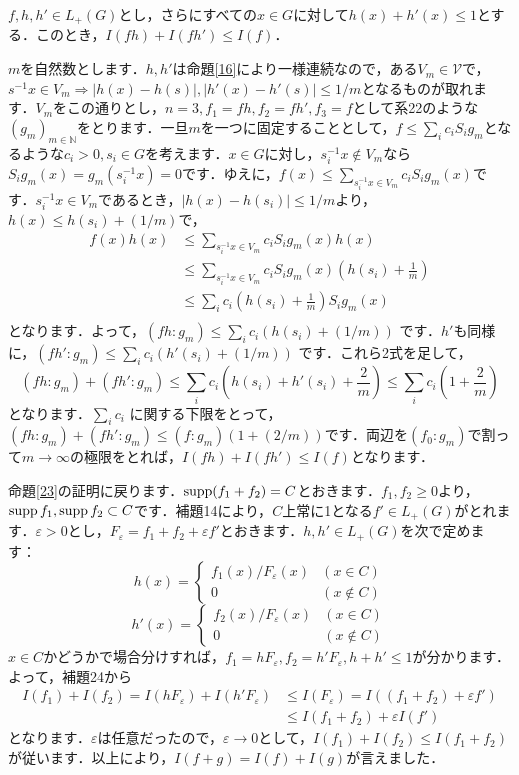 \begin{Proof}
\begin{ylem}\label{24}
$f, h, h'\in L_{+}(G)$とし，さらにすべての$x \in G$に対して$h(x)+h'(x) \le 1$とする．このとき，$I(fh)+I(fh') \le I(f)$．
\end{ylem}
\begin{Proof}
$m$を自然数とします．$h,h'$は命題\ref{16}により一様連続なので，ある$V_m \in \mathscr{V}$で，$s^{-1}x \in V_{m} \Rightarrow |h(x)-h(s)|, |h'(x)-h'(s)| \le 1/m$となるものが取れます．$V_m$をこの通りとし，$n=3, f_1=fh, f_2=fh', f_3=f$として系22のような$(g_m)_{m \in \mathbb{N}}$をとります．一旦$m$を一つに固定することとして，$f \le \sum_{i}c_i S_{i}g_m$となるような$c_i>0, s_i \in G$を考えます．$x \in G$に対し，$s_{i}^{-1}x \not\in V_m$なら$S_{i}g_{m}(x)=g_{m}(s_{i}^{-1}x)=0$です．ゆえに，$f(x) \le \sum_{s_{i}^{-1}x \in V_m} c_{i}S_{i}g_{m}(x)$です．$s_{i}^{-1}x \in V_m$であるとき，$|h(x)-h(s_i)| \le 1/m$より，$h(x) \le h(s_i)+(1/m)$で，
\begin{align*}
f(x)h(x)  & \le \sum_{s_{i}^{-1}x \in V_m} c_{i}S_{i}g_{m}(x)h(x) \\
& \le \sum_{s_{i}^{-1}x \in V_m} c_{i}S_{i}g_{m}(x) \left( h(s_i)+\frac{1}{m} \right) \\
& \le \sum_{i}c_{i} \left( h(s_i)+\frac{1}{m} \right) S_{i}g_{m}(x) \\
\end{align*}
となります．よって，$( fh : g_m ) \le \sum_{i}c_{i} ( h(s_i)+(1/m) )$ です．$h'$も同様に，$( fh' : g_m ) \le \sum_{i}c_{i} ( h'(s_i)+(1/m) )$ です．これら2式を足して，
\[
( fh : g_m )+( fh' : g_m ) \le \sum_{i}c_{i} \left( h(s_i)+h'(s_i)+\frac{2}{m} \right) \le \sum_{i}c_{i} \left( 1+\frac{2}{m} \right)
\]
となります．$\sum_{i}c_{i}$ に関する下限をとって，$( fh : g_m )+( fh' : g_m ) \le ( f : g_m ) ( 1+(2/m) )$です．両辺を$(f_0 : g_m)$で割って$m \to \infty$の極限をとれば，$I(fh)+I(fh') \le I(f)$となります．　
\end{Proof}
命題\ref{23}の証明に戻ります．$\operatorname{supp} (f_{1}+f_{2})=C$とおきます．$f_1, f_2 \ge 0$より，$\operatorname{supp} f_1, \operatorname{supp} f_2 \subset C$です．補題14により，$C$上常に1となる$f' \in L_{+}(G)$がとれます．$\varepsilon>0$とし，$F_{\varepsilon}=f_{1}+f_{2}+\varepsilon f'$とおきます．$h,h' \in L_{+}(G)$を次で定めます：
\[
h(x)=
\begin{cases}
f_{1}(x)/F_{\varepsilon}(x) & (x \in C) \\
0 & (x \not\in C)
\end{cases}
\]
\[
h'(x)=
\begin{cases}
f_{2}(x)/F_{\varepsilon}(x) & (x \in C) \\
0 & (x \not\in C)
\end{cases}
\]
$x \in C$かどうかで場合分けすれば，$f_{1}=hF_{\varepsilon}, f_{2}=h'F_{\varepsilon}, h+h' \le 1$が分かります．よって，補題24から
\begin{align*}
I(f_1)+I(f_2) = I(hF_{\varepsilon})+I(h'F_{\varepsilon}) & \le I(F_{\varepsilon})=I ( (f_{1}+f_{2})+\varepsilon f' ) \\
& \le I(f_{1}+f_{2})+ \varepsilon I(f')
\end{align*}
となります．$\varepsilon$は任意だったので，$\varepsilon \to 0$として，$I(f_1)+I(f_2) \le I(f_{1}+f_{2})$が従います．以上により，$I(f+g)=I(f)+I(g)$が言えました．　
\end{Proof}

